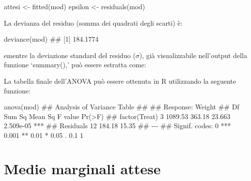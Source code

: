 \documentclass[a4paper,12pt,oneside]{book}
\newenvironment{Shaded}{\begin{snugshade}}{\end{snugshade}}
\newcommand{\SpecialCharTok}[1]{#1}
\newcommand{\DocumentationTok}[1]{#1}
\newcommand{\OtherTok}[1]{#1}
\newcommand{\FunctionTok}[1]{#1}
\newcommand{\NormalTok}[1]{#1}
\begin{document}
\begin{Shaded}
\begin{Highlighting}[]
\NormalTok{attesi }\OtherTok{\textless{}{-}} \FunctionTok{fitted}\NormalTok{(mod)}
\NormalTok{epsilon }\OtherTok{\textless{}{-}} \FunctionTok{residuals}\NormalTok{(mod)}
\end{Highlighting}
\end{Shaded}

La devianza del residuo (somma dei quadrati degli scarti) è:

\begin{Shaded}
\begin{Highlighting}[]
\FunctionTok{deviance}\NormalTok{(mod)}
\DocumentationTok{\#\# [1] 184.1774}
\end{Highlighting}
\end{Shaded}

ementre la deviazione standard del residuo (\(\sigma\)), già visualizzabile nell'output della funzione `summary(),' può essere estratta come:

\begin{Shaded}
\end{Shaded}

La tabella finale dell'ANOVA può essere ottenuta in R utilizzando la seguente funzione:

\begin{Shaded}
\begin{Highlighting}[]
\FunctionTok{anova}\NormalTok{(mod)}
\DocumentationTok{\#\# Analysis of Variance Table}
\DocumentationTok{\#\# }
\DocumentationTok{\#\# Response: Weight}
\DocumentationTok{\#\#               Df  Sum Sq Mean Sq F value    Pr(\textgreater{}F)    }
\DocumentationTok{\#\# factor(Treat)  3 1089.53  363.18  23.663 2.509e{-}05 ***}
\DocumentationTok{\#\# Residuals     12  184.18   15.35                      }
\DocumentationTok{\#\# {-}{-}{-}}
\DocumentationTok{\#\# Signif. codes:  0 \textquotesingle{}***\textquotesingle{} 0.001 \textquotesingle{}**\textquotesingle{} 0.01 \textquotesingle{}*\textquotesingle{} 0.05 \textquotesingle{}.\textquotesingle{} 0.1 \textquotesingle{} \textquotesingle{} 1}
\end{Highlighting}
\end{Shaded}

\hypertarget{medie-marginali-attese}{%
\section{Medie marginali attese}\label{medie-marginali-attese}}
\end{document}
